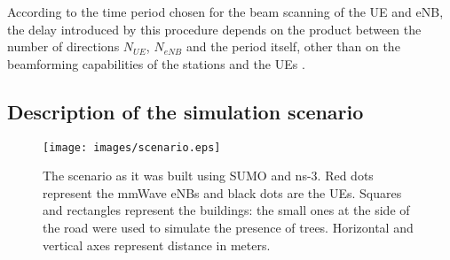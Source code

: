 \documentclass[conference,10pt]{IEEEtran}
\begin{document}
According to the time period chosen for the beam scanning of the UE and eNB, the delay introduced by this procedure depends on the product between the number of directions $N_{UE}$, $N_{eNB}$ and the period itself, other than on the beamforming capabilities of the stations and the UEs \cite{imphand}.

\subsection{Description of the simulation scenario}

\begin{figure*}[ht]
	\begin{center}    
		\texttt{[image: images/scenario.eps]}
		\caption{The scenario as it was built using SUMO and ns-3. Red dots represent the mmWave eNBs and black dots are the UEs. Squares and rectangles represent the buildings: the small ones at the side of the road were used to simulate the presence of trees. Horizontal and vertical axes represent distance in meters.}
		\label{fig:scenario}
	\end{center}
\end{figure*}
\end{document}
